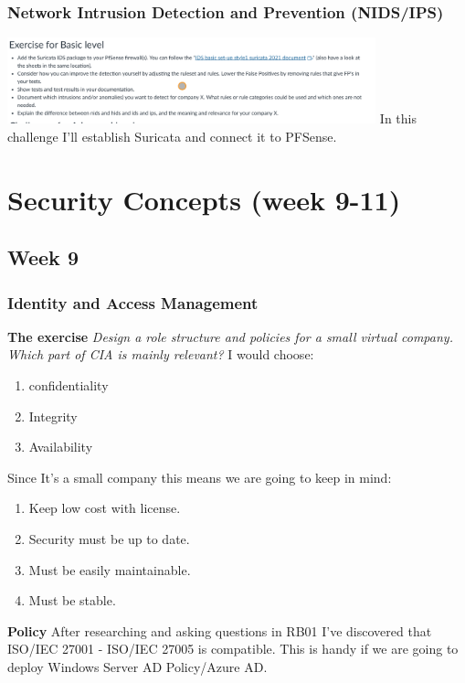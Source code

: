 \documentclass[12pt, letterpaper]{article}
\begin{document}
\subsubsection{Network Intrusion Detection and Prevention (NIDS/IPS)}
\includegraphics[width=0.8\textwidth]{fotos/Week 8/Network Intrusion Detection and Prevention/Basic.jpeg}
\hfill\break
\hfill\break
In this challenge I'll establish Suricata and connect it to PFSense.
\hfill\break
\hfill\break
\newpage
\section{Security Concepts (week 9-11)}
\subsection{Week 9}
\subsubsection{Identity and Access Management}
\textbf{The exercise}
\hfill\break
\hfill\break
\emph{Design a role structure and policies for a small virtual company. Which part of CIA is mainly relevant?}
\hfill\break
\hfill\break
I would choose:
\begin{enumerate}
    \item confidentiality
    \item Integrity
    \item Availability
\end{enumerate}

Since It's a small company this means we are going to keep in mind:
\begin{enumerate}
    \item Keep low cost with license.
    \item Security must be up to date.
    \item Must be easily maintainable. 
    \item Must be stable.
\end{enumerate}
\textbf{Policy}
\hfill\break
After researching and asking questions in RB01 I've discovered that ISO/IEC 27001 - ISO/IEC 27005 is compatible. This is handy if we are going to deploy Windows Server AD Policy/Azure AD.
\end{document}
